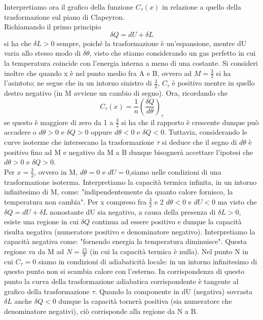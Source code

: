\documentclass[
10pt, %
a4paper, %
oneside, %
headinclude,footinclude, %
BCOR5mm, %
]{scrartcl}
\begin{document}
\begin{exercise}
	Interpretiamo ora il grafico della funzione $C_{\tau}(x)$ in relazione a quello della trasformazione sul piano di Clapeyron.\\
	
	Richiamando il primo principio \[\delta Q = dU + \delta L\] si ha che $\delta L > 0$ sempre, poiché la trasformazione è un'espansione, mentre dU varia allo stesso modo di $\delta\theta$, visto che stiamo considerando un gas perfetto in cui la temperatura coincide con l'energia interna a meno di una costante.
	Si consideri inoltre che quando x è nel punto medio fra A e B, ovvero ad \(M=\frac{3}{2}\) si ha l'asintoto; ne segue che in un intorno sinistro di $\frac{3}{2}$, $C_{\tau}$ è positivo mentre in quello destro negativo (in M avviene un cambio di segno). Ora, ricordando che \[C_{\tau}(x) = \frac{1}{n}\left(\frac{\delta Q}{d\theta}\right)_{\tau}\] se questo è maggiore di zero da 1 a $\frac{3}{2}$ si ha che il rapporto è crescente dunque può accadere o \(d\theta > 0\) e \(\delta Q > 0\) oppure \(d\theta < 0\) e \(\delta Q < 0\). Tuttavia, considerando le curve isoterme che intersecano la trasformazione $\tau$ si deduce che il segno di $d\theta$ è positivo fino ad M e negativo da M a B dunque bisognerà accettare l'ipotesi che \(d\theta > 0\) e \(\delta Q > 0\). \\
	Per \(x = \frac{3}{2}\), ovvero in M, \(d\theta = 0\) e \(dU = 0\),siamo nelle condizioni di una trasformazione isoterma. Interpretiamo la capacità termica infinita, in un intorno infinitesimo di M, come: "indipendentemente da quanto calore fornisco, la temperatura non cambia".
	Per x compreso fra $\frac{3}{2}$ e 2 \(d\theta < 0\) e \(dU < 0\) ma visto che \(\delta Q = dU + \delta L\) nonostante dU sia negativo, a causa della presenza di $\delta L > 0$, esiste una regione in cui $\delta Q$ continua ad essere positivo e dunque la capacità risulta negativa (numeratore positivo e denominatore negativo). Interpretiamo la capacità negativa come: "fornendo energia la temperatura diminuisce". Questa regione va da M ad $N = \frac{15}{8}$ (in cui la capacità termica è nulla).
	Nel punto N in cui $C_{\tau}=0$ siamo in condizioni di adiabaticità locale: in un intorno infinitesimo di questo punto non si scambia calore con l'esterno. In corrispondenza di questo punto la curva della trasformazione adiabatica corrispondente è tangente al grafico della trasformazione $\tau$.
	Quando la componente in dU (negativa) sovrasta $\delta L$ anche $\delta Q < 0$ dunque la capacità tornerà positiva (sia numeratore che denominatore negativi), ciò corrisponde alla regione da N a B. 
\end{exercise}
\newpage
\end{document}
